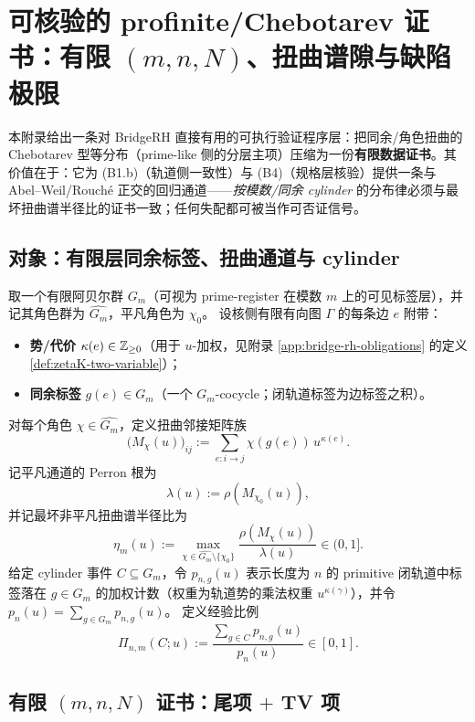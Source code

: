 \section{可核验的 profinite/Chebotarev 证书：有限 \texorpdfstring{$(m,n,N)$}{(m,n,N)}、扭曲谱隙与缺陷极限}\label{app:auditable-profinite-chebotarev}

本附录给出一条对 BridgeRH 直接有用的可执行验证程序层：把同余/角色扭曲的 Chebotarev 型等分布（prime-like 侧的分层主项）压缩为一份\textbf{有限数据证书}。其价值在于：它为 (B1.b)（轨道侧一致性）与 (B4)（规格层核验）提供一条与 Abel--Weil/Rouch{\'e} 正交的回归通道——\emph{按模数/同余 cylinder} 的分布律必须与最坏扭曲谱半径比的证书一致；任何失配都可被当作可否证信号。

\subsection{对象：有限层同余标签、扭曲通道与 cylinder}\label{subsec:profinite-chebotarev-objects}
取一个有限阿贝尔群 $G_m$（可视为 prime-register 在模数 $m$ 上的可见标签层），并记其角色群为 $\widehat{G_m}$，平凡角色为 $\chi_0$。
设核侧有限有向图 $\Gamma$ 的每条边 $e$ 附带：
\begin{itemize}
  \item \textbf{势/代价} $\kappa(e)\in\mathbb{Z}_{\ge 0}$（用于 $u$-加权，见附录 \ref{app:bridge-rh-obligations} 的定义 \ref{def:zetaK-two-variable}）；
  \item \textbf{同余标签} $g(e)\in G_m$（一个 $G_m$-cocycle；闭轨道标签为边标签之积）。
\end{itemize}
对每个角色 $\chi\in\widehat{G_m}$，定义扭曲邻接矩阵族
$$
\bigl(M_{\chi}(u)\bigr)_{ij}:=\sum_{e:i\to j}\chi(g(e))\,u^{\kappa(e)}.
$$
记平凡通道的 Perron 根为
$$
\lambda(u):=\rho(M_{\chi_0}(u)),
$$
并记最坏非平凡扭曲谱半径比为
$$
\eta_m(u):=\max_{\chi\in\widehat{G_m}\setminus\{\chi_0\}}\frac{\rho(M_{\chi}(u))}{\lambda(u)}\in(0,1].
$$
给定 cylinder 事件 $C\subseteq G_m$，令 $p_{n,g}(u)$ 表示长度为 $n$ 的 primitive 闭轨道中标签落在 $g\in G_m$ 的加权计数（权重为轨道势的乘法权重 $u^{\kappa(\gamma)}$），并令 $p_n(u)=\sum_{g\in G_m}p_{n,g}(u)$。
定义经验比例
$$
\Pi_{n,m}(C;u):=\frac{\sum_{g\in C}p_{n,g}(u)}{p_n(u)}\in[0,1].
$$

\subsection{有限 \texorpdfstring{$(m,n,N)$}{(m,n,N)} 证书：尾项 \texorpdfstring{$+$}{+} TV 项}\label{subsec:profinite-chebotarev-finite}

